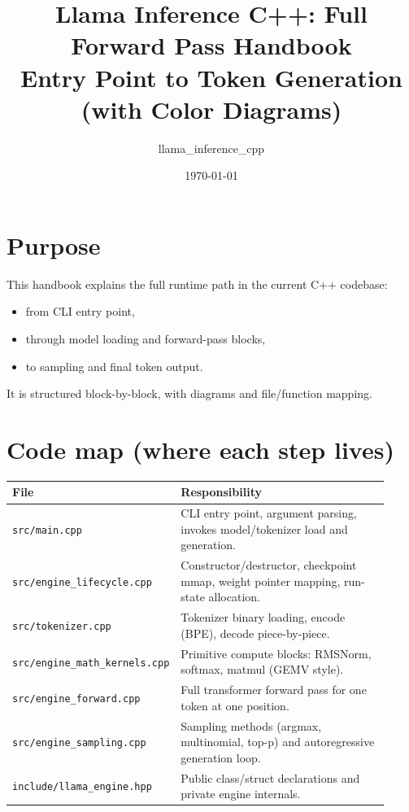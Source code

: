 \documentclass[11pt]{article}
\title{Llama Inference C++: Full Forward Pass Handbook\\\large Entry Point to Token Generation (with Color Diagrams)}
\author{llama\_inference\_cpp}
\date{\today}
\begin{document}
\maketitle
\tableofcontents
\newpage

\section{Purpose}
This handbook explains the full runtime path in the current C++ codebase:
\begin{itemize}[leftmargin=*]
  \item from CLI entry point,
  \item through model loading and forward-pass blocks,
  \item to sampling and final token output.
\end{itemize}
It is structured block-by-block, with diagrams and file/function mapping.

\section{Code map (where each step lives)}
\begin{longtable}{p{0.30\linewidth} p{0.62\linewidth}}
\toprule
\textbf{File} & \textbf{Responsibility} \\
\midrule
\endhead
\texttt{src/main.cpp} & CLI entry point, argument parsing, invokes model/tokenizer load and generation. \\
\texttt{src/engine\_lifecycle.cpp} & Constructor/destructor, checkpoint mmap, weight pointer mapping, run-state allocation. \\
\texttt{src/tokenizer.cpp} & Tokenizer binary loading, encode (BPE), decode piece-by-piece. \\
\texttt{src/engine\_math\_kernels.cpp} & Primitive compute blocks: RMSNorm, softmax, matmul (GEMV style). \\
\texttt{src/engine\_forward.cpp} & Full transformer forward pass for one token at one position. \\
\texttt{src/engine\_sampling.cpp} & Sampling methods (argmax, multinomial, top-p) and autoregressive generation loop. \\
\texttt{include/llama\_engine.hpp} & Public class/struct declarations and private engine internals. \\
\bottomrule
\end{longtable}
\end{document}
